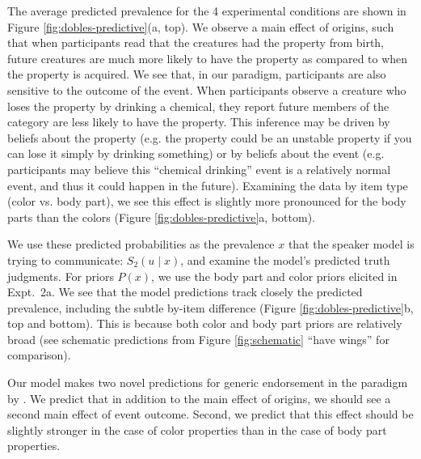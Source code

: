 \documentclass[12pt,letterpaper]{article}
\newcommand{\ndg}[1]{\textcolor{Green}{[ndg: #1]}}
\begin{document}
The average predicted prevalence for the 4 experimental conditions are shown in Figure \ref{fig:dobles-predictive}(a, top).
We observe a main effect of origins, such that when participants read that the creatures had the property from birth, future creatures  are much more likely to have the property as compared to when the property is acquired.
We see that, in our paradigm, participants are also sensitive to the outcome of the event.%
When participants observe a creature who loses the property by drinking a chemical, they report future members of the category are less likely to have the property.
This inference may be driven by beliefs about the property (e.g. the property could be an unstable property if you can lose it simply by drinking something) or by beliefs about the event (e.g. participants may believe this ``chemical drinking'' event is a relatively normal event, and thus it could happen in the future).
Examining the data by item type (color vs. body part), we see this effect is slightly more pronounced for the body parts than the colors (Figure \ref{fig:dobles-predictive}a, bottom). 

We use these predicted probabilities as the prevalence $x$ that the speaker model is trying to communicate: $S_2(u\mid x)$, and examine the model's predicted truth judgments.
For priors $P(x)$, we use the body part and color priors elicited in Expt.~2a.
We see that the model predictions track closely the predicted prevalence, including the subtle by-item difference (Figure \ref{fig:dobles-predictive}b, top and bottom).
This is because both color and body part priors are relatively broad (see schematic predictions from Figure \ref{fig:schematic} ``have wings'' for comparison).

Our model makes two novel predictions for generic endorsement in the paradigm by .
We predict that in addition to the main effect of origins, we should see a second main effect of event outcome.
Second, we predict that this effect should be slightly stronger in the case of color properties than in the case of body part properties.
\end{document}
